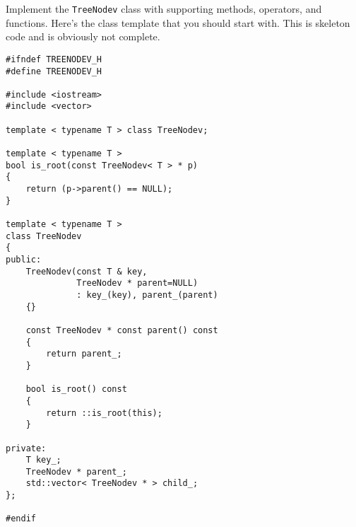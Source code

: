 Implement the \verb!TreeNodev! class with supporting
methods, operators, and functions.
Here's the class template that you should start with.
This is skeleton code and is obviously not complete.

\begin{Verbatim}[frame=single,fontsize=\footnotesize]
#ifndef TREENODEV_H
#define TREENODEV_H

#include <iostream>
#include <vector>

template < typename T > class TreeNodev;

template < typename T >
bool is_root(const TreeNodev< T > * p)
{
    return (p->parent() == NULL);
}  

template < typename T >
class TreeNodev
{
public:
    TreeNodev(const T & key,
              TreeNodev * parent=NULL)
              : key_(key), parent_(parent)
    {}

    const TreeNodev * const parent() const
    {
        return parent_;
    }
      
    bool is_root() const
    {
        return ::is_root(this);
    }
      
private:
    T key_;
    TreeNodev * parent_;
    std::vector< TreeNodev * > child_;
};

#endif
\end{Verbatim}
